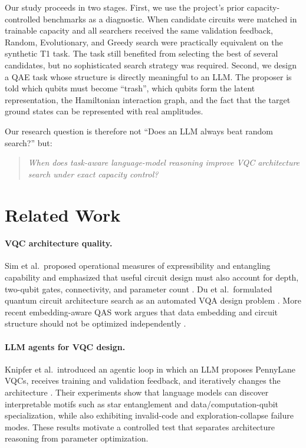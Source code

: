 \documentclass[11pt]{article}
\begin{document}
Our study proceeds in two stages.
First, we use the project's prior capacity-controlled benchmarks as a diagnostic.
When candidate circuits were matched in trainable capacity and all searchers received the same validation feedback, Random, Evolutionary, and Greedy search were practically equivalent on the synthetic T1 task.
The task still benefited from selecting the best of several candidates, but no sophisticated search strategy was required.
Second, we design a QAE task whose structure is directly meaningful to an LLM.
The proposer is told which qubits must become ``trash'', which qubits form the latent representation, the Hamiltonian interaction graph, and the fact that the target ground states can be represented with real amplitudes.

Our research question is therefore not ``Does an LLM always beat random search?'' but:
\begin{quote}
\emph{When does task-aware language-model reasoning improve VQC architecture search under exact capacity control?}
\end{quote}

\section{Related Work}

\paragraph{VQC architecture quality.}
Sim et al.\ proposed operational measures of expressibility and entangling capability and emphasized that useful circuit design must also account for depth, two-qubit gates, connectivity, and parameter count \cite{sim2019}.
Du et al.\ formulated quantum circuit architecture search as an automated VQA design problem \cite{du2022}.
More recent embedding-aware QAS work argues that data embedding and circuit structure should not be optimized independently \cite{dai2026}.

\paragraph{LLM agents for VQC design.}
Knipfer et al.\ introduced an agentic loop in which an LLM proposes PennyLane VQCs, receives training and validation feedback, and iteratively changes the architecture \cite{knipfer2026}.
Their experiments show that language models can discover interpretable motifs such as star entanglement and data/computation-qubit specialization, while also exhibiting invalid-code and exploration-collapse failure modes.
These results motivate a controlled test that separates architecture reasoning from parameter optimization.
\end{document}
